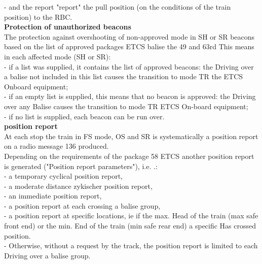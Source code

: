 \documentclass{template/openetcs_report}
\begin{document}
- and the report "report" the pull position (on the conditions of the train position) to the 
RBC. \\

\textbf{Protection of unauthorized beacons}\\
The protection against overshooting of non-approved mode in SH or SR beacons based 
on the list of approved packages ETCS balise the 49 and 63rd 
This means in each affected mode (SH or SR): \\
 
- if a list was supplied, it contains the list of approved beacons: the 
Driving over a balise not included in this list causes the transition to mode TR 
the ETCS Onboard equipment; \\

- if an empty list is supplied, this means that no beacon is approved: the 
Driving over any Balise causes the transition to mode TR ETCS
On-board equipment; \\

- if no list is supplied, each beacon can be run over. \\


\textbf{position report }\\
At each stop the train in FS mode, OS and SR is systematically a position report on 
a radio message 136 produced. \\

Depending on the requirements of the package 58 ETCS another position report is generated 
("Position report parameters"), i.e. .: \\
 
- a temporary cyclical position report, \\

- a moderate distance zykischer position report, \\

- an immediate position report, \\

- a position report at each crossing a balise group, \\

- a position report at specific locations, ie if the max. Head of the train 
(max safe front end) or the min. End of the train (min safe rear end) a specific 
Has crossed position. \\

- Otherwise, without a request by the track, the position report is limited to each 
Driving over a balise group.\\
\end{document}
